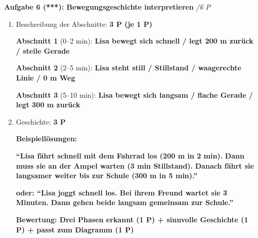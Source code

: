 \documentclass[11pt,a4paper]{article}
\newcommand{\lsg}[1]{\textcolor{loesung}{\textbf{#1}}}
\newcommand{\stern}[1]{\textbf{(#1)}}
\newcommand{\punkte}[1]{\hfill \textit{/#1 P}}
\begin{document}
\vspace{1em}

\noindent\textbf{Aufgabe 6 \stern{***}: Bewegungsgeschichte interpretieren} \punkte{6}

\vspace{0.5em}
\begin{center}
\end{center}

\begin{enumerate}[label=\alph*), leftmargin=2em]
    \item Beschreibung der Abschnitte: \hfill \lsg{3 P (je 1 P)}

    \textbf{Abschnitt 1} (0--2 min): \lsg{Lisa bewegt sich schnell / legt 200 m zurück / steile Gerade}

    \textbf{Abschnitt 2} (2--5 min): \lsg{Lisa steht still / Stillstand / waagerechte Linie / 0 m Weg}

    \textbf{Abschnitt 3} (5--10 min): \lsg{Lisa bewegt sich langsam / flache Gerade / legt 300 m zurück}

    \item Geschichte: \hfill \lsg{3 P}

    \textbf{Beispiellösungen:}

    \lsg{``Lisa fährt schnell mit dem Fahrrad los (200 m in 2 min).}
    \lsg{Dann muss sie an der Ampel warten (3 min Stillstand).}
    \lsg{Danach fährt sie langsamer weiter bis zur Schule (300 m in 5 min).''}

    \vspace{0.3em}
    \lsg{oder: ``Lisa joggt schnell los. Bei ihrem Freund wartet sie 3 Minuten.}
    \lsg{Dann gehen beide langsam gemeinsam zur Schule.''}

    \vspace{0.3em}
    \lsg{Bewertung: Drei Phasen erkannt (1 P) + sinnvolle Geschichte (1 P) + passt zum Diagramm (1 P)}
\end{enumerate}
\end{document}
